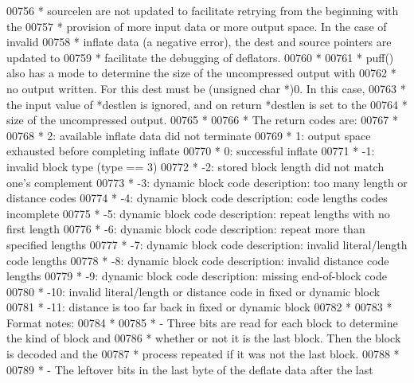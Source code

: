 \begin{DoxyCode}
00756 \textcolor{comment}{ * sourcelen are not updated to facilitate retrying from the beginning with the}
00757 \textcolor{comment}{ * provision of more input data or more output space.  In the case of invalid}
00758 \textcolor{comment}{ * inflate data (a negative error), the dest and source pointers are updated to}
00759 \textcolor{comment}{ * facilitate the debugging of deflators.}
00760 \textcolor{comment}{ *}
00761 \textcolor{comment}{ * puff() also has a mode to determine the size of the uncompressed output with}
00762 \textcolor{comment}{ * no output written.  For this dest must be (unsigned char *)0.  In this case,}
00763 \textcolor{comment}{ * the input value of *destlen is ignored, and on return *destlen is set to the}
00764 \textcolor{comment}{ * size of the uncompressed output.}
00765 \textcolor{comment}{ *}
00766 \textcolor{comment}{ * The return codes are:}
00767 \textcolor{comment}{ *}
00768 \textcolor{comment}{ *   2:  available inflate data did not terminate}
00769 \textcolor{comment}{ *   1:  output space exhausted before completing inflate}
00770 \textcolor{comment}{ *   0:  successful inflate}
00771 \textcolor{comment}{ *  -1:  invalid block type (type == 3)}
00772 \textcolor{comment}{ *  -2:  stored block length did not match one's complement}
00773 \textcolor{comment}{ *  -3:  dynamic block code description: too many length or distance codes}
00774 \textcolor{comment}{ *  -4:  dynamic block code description: code lengths codes incomplete}
00775 \textcolor{comment}{ *  -5:  dynamic block code description: repeat lengths with no first length}
00776 \textcolor{comment}{ *  -6:  dynamic block code description: repeat more than specified lengths}
00777 \textcolor{comment}{ *  -7:  dynamic block code description: invalid literal/length code lengths}
00778 \textcolor{comment}{ *  -8:  dynamic block code description: invalid distance code lengths}
00779 \textcolor{comment}{ *  -9:  dynamic block code description: missing end-of-block code}
00780 \textcolor{comment}{ * -10:  invalid literal/length or distance code in fixed or dynamic block}
00781 \textcolor{comment}{ * -11:  distance is too far back in fixed or dynamic block}
00782 \textcolor{comment}{ *}
00783 \textcolor{comment}{ * Format notes:}
00784 \textcolor{comment}{ *}
00785 \textcolor{comment}{ * - Three bits are read for each block to determine the kind of block and}
00786 \textcolor{comment}{ *   whether or not it is the last block.  Then the block is decoded and the}
00787 \textcolor{comment}{ *   process repeated if it was not the last block.}
00788 \textcolor{comment}{ *}
00789 \textcolor{comment}{ * - The leftover bits in the last byte of the deflate data after the last}

\end{DoxyCode}
